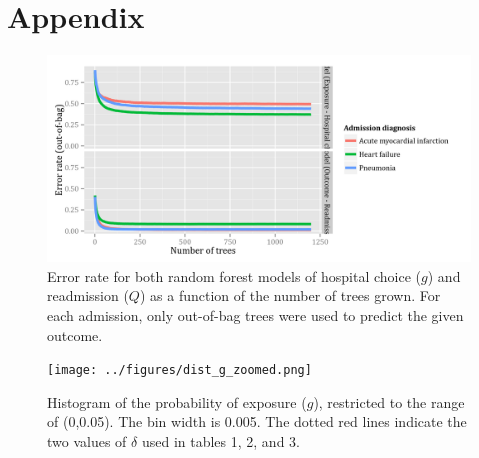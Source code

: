 \documentclass[]{article}\usepackage[]{graphicx}\usepackage[]{color}
\begin{document}
\section{Appendix}
\begin{figure}[H]
    \includegraphics{../figures/error_rate_for_hospital_choice.png}
    \caption[Error rate for random forest model of hospital choice.]
      {Error rate for both random forest models of hospital choice ($g$) and readmission ($Q$) as a function of the number of trees grown. For each admission, only out-of-bag trees were used to predict the given outcome.}
    \label{fig:error_rate_for_hospital_choice}
\end{figure}


\begin{figure}[H]
    \texttt{[image: ../figures/dist\_g\_zoomed.png]}
    \caption[Histogram of the probability of exposure ($g$), restricted to the range of (0,0.05). The bin width is 0.005. The dotted red lines indicate the two values of $\delta$ used in tables 1, 2, and 3.]
      {Histogram of the probability of exposure ($g$), restricted to the range of (0,0.05). The bin width is 0.005. The dotted red lines indicate the two values of $\delta$ used in tables 1, 2, and 3.}
    \label{fig:dist_g_zoomed}
\end{figure}
\end{document}
